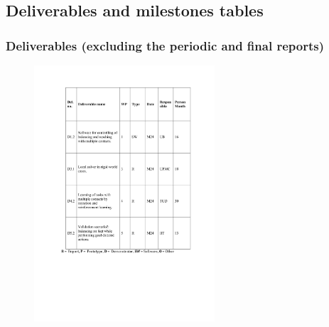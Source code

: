 \documentclass[12pt,a4paper,twoside]{article}
\begin{document}





















\subsection{Deliverables and milestones tables}

\subsubsection{Deliverables (excluding the periodic and final reports)}

\begin{figure}[ht!]
\centering
\includegraphics[width=0.6\textwidth]{./images/deliverables.pdf}
\end{figure}
\end{document}
